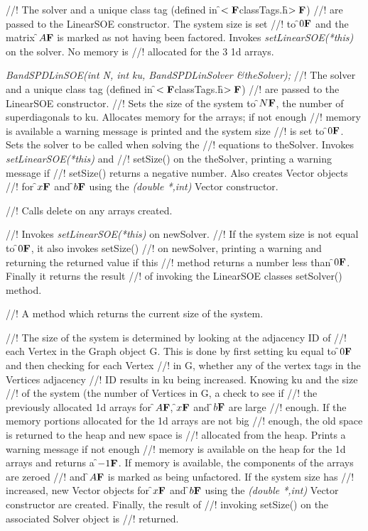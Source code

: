 //! The \p solver and a unique class tag (defined in \f$<{\bf F}$classTags.h\f$>{\bf F}$)
//! are passed to the LinearSOE constructor. The system size is set
//! to \f$0{\bf F}$ and the matrix \f$A{\bf F}$ is marked as not having been factored. Invokes
{\em setLinearSOE(*this)} on the \p solver. No memory is
//! allocated for the 3 1d arrays.  

{\em BandSPDLinSOE(int N, int ku, BandSPDLinSolver \&theSolver);}
//! The \p solver and a unique class tag (defined in \f$<{\bf F}$classTags.h\f$>{\bf F}$)
//! are passed to the LinearSOE constructor. 
//! Sets the size of the system to \f$N{\bf F}$, the number of superdiagonals to 
\p ku. Allocates memory for the arrays; if not enough
//! memory is available a warning message is printed and the system size
//! is set to \f$0{\bf F}$. Sets the solver to be called when solving the
//! equations to \p theSolver. Invokes {\em setLinearSOE(*this)} and
//! setSize() on the \p theSolver, printing a warning message if
//! setSize() returns a negative number. Also creates Vector objects
//! for \f$x{\bf F}$ and \f$b{\bf F}$ using the {\em (double *,int)} Vector constructor.


//! Calls delete on any arrays created.

//! Invokes {\em setLinearSOE(*this)} on \p newSolver.
//! If the system size is not equal to \f$0{\bf F}$, it also invokes setSize()
//! on \p newSolver, printing a warning and returning the returned value if this
//! method returns a number less than \f$0{\bf F}$. Finally it returns the result
//! of invoking the LinearSOE classes setSolver() method.

//! A method which returns the current size of the system.

//! The size of the system is determined by looking at the adjacency ID of
//! each Vertex in the Graph object \p G. This is done by first setting
\p ku equal to \f$0{\bf F}$ and then checking for each Vertex
//! in \p G, whether any of the vertex tags in the Vertices adjacency
//! ID results in \p ku being increased. Knowing \p ku and the size
//! of the system (the number of Vertices in \p G, a check to see if
//! the previously allocated 1d arrays for \f$A{\bf F}$, \f$x{\bf F}$ and \f$b{\bf F}$ are large
//! enough. If the memory portions allocated for the 1d arrays are not big
//! enough, the old space is returned to the heap and new space is
//! allocated from the heap. Prints a warning message if not enough
//! memory is available on the heap for the 1d arrays and returns a
\f$-1{\bf F}$. If memory is available, the components of the arrays are zeroed
//! and \f$A{\bf F}$ is marked as being unfactored. If the system size has
//! increased, new Vector objects for \f$x{\bf F}$ and \f$b{\bf F}$ using the {\em (double
*,int)} Vector constructor are created. Finally, the result of
//! invoking setSize() on the associated Solver object is
//! returned. 


